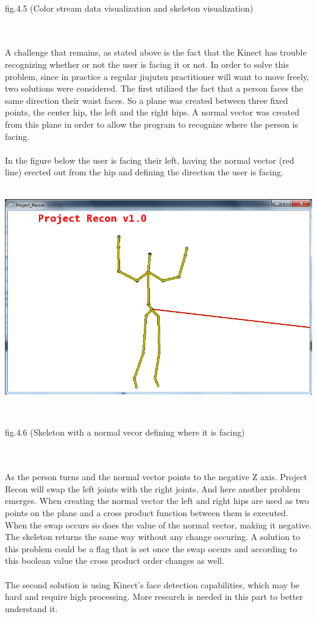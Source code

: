 \documentclass[11pt]{article} %
\begin{document}
\\
\centerline{fig.4.5 (Color stream data visualization and skeleton visualization)}
\\
\\
A challenge that remains, as stated above is the fact that the Kinect has trouble recognizing whether or not the user is facing it or not. In order to solve this problem, since in practice a regular jiujutsu practitioner will want to move freely, two solutions were considered. The first utilized the fact that a person faces the same direction their waist faces. So a plane was created between three fixed points, the center hip, the left and the right hips. A normal vector was created from this plane in order to allow the program to recognize where the person is facing.
\\
\\
In the figure below the user is facing their left, having the normal vector (red line) erected out from the hip and defining the direction the user is facing.
\\
\\
\centerline{\includegraphics[scale=0.5]{skeleton_normal.png}}
\\
\centerline{fig.4.6 (Skeleton with a normal vecor defining where it is facing)}
\\
\\
As the person turns and the normal vector points to the negative Z axis. Project Recon will swap the left joints with the right joints. And here another problem emerges. When creating the normal vector the left and right hips are used as two points on the plane and a cross product function between them is executed. When the swap occurs so does the value of the normal vector, making it negative. The skeleton returns the same way without any change occuring. A solution to this problem could be a flag that is set once the swap occurs and according to this boolean value the cross product order changes as well.
\\
\\
The second solution is using Kinect's face detection capabilities, which may be hard and require high processing. More research is needed in this part to better understand it.
\end{document}
